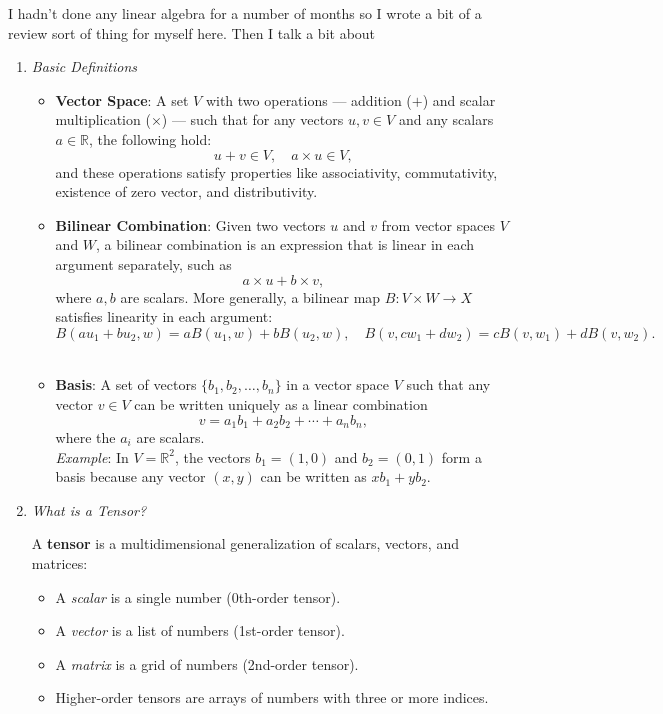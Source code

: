 \documentclass[titlepage]{article}
\begin{document}
\begin{itemize}
    I hadn't done any linear algebra for a number of months so I wrote a bit of a review sort of thing for myself here. Then I talk a bit about 
    \begin{enumerate}
    \item \textit{Basic Definitions}
    
    \begin{itemize}
        \item \textbf{Vector Space}: A set $V$ with two operations — addition ($+$) and scalar multiplication ($\times$) — such that for any vectors $u,v \in V$ and any scalars $a\in \mathbb{R}$, the following hold:
        \[
        u + v \in V, \quad a \times u \in V,
        \]
        and these operations satisfy properties like associativity, commutativity, existence of zero vector, and distributivity. 
        \\
        
        \item \textbf{Bilinear Combination}: Given two vectors $u$ and $v$ from vector spaces $V$ and $W$, a bilinear combination is an expression that is linear in each argument separately, such as
        \[
        a \times u + b \times v,
        \]
        where $a,b$ are scalars. More generally, a bilinear map $B: V \times W \to X$ satisfies linearity in each argument:
        \[
        B(a u_1 + b u_2, w) = a B(u_1, w) + b B(u_2, w), \quad B(v, c w_1 + d w_2) = c B(v, w_1) + d B(v, w_2).
        \]
        \\
        
        \item \textbf{Basis}: A set of vectors $\{b_1, b_2, \ldots, b_n\}$ in a vector space $V$ such that any vector $v \in V$ can be written uniquely as a linear combination
        \[
        v = a_1 b_1 + a_2 b_2 + \cdots + a_n b_n,
        \]
        where the $a_i$ are scalars.
        \\
        \textit{Example}: In $V = \mathbb{R}^2$, the vectors $b_1 = (1,0)$ and $b_2 = (0,1)$ form a basis because any vector $(x,y)$ can be written as $x b_1 + y b_2$.
    \end{itemize}
    
    \item \textit{What is a Tensor?}
    
    A \textbf{tensor} is a multidimensional generalization of scalars, vectors, and matrices:
    
    \begin{itemize}
        \item A \textit{scalar} is a single number (0th-order tensor).
        \item A \textit{vector} is a list of numbers (1st-order tensor).
        \item A \textit{matrix} is a grid of numbers (2nd-order tensor).
        \item Higher-order tensors are arrays of numbers with three or more indices.
    \end{itemize}
    

\end{enumerate}
\end{itemize}
\end{document}
